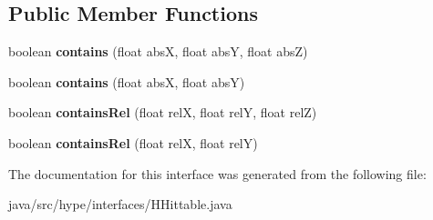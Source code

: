 \subsection*{Public Member Functions}
\begin{DoxyCompactItemize}
\item 
\hypertarget{interfacehype_1_1interfaces_1_1_h_hittable_a50445e254a7c17d114b50c1b6eb27ccc}{boolean {\bfseries contains} (float abs\-X, float abs\-Y, float abs\-Z)}\label{interfacehype_1_1interfaces_1_1_h_hittable_a50445e254a7c17d114b50c1b6eb27ccc}

\item 
\hypertarget{interfacehype_1_1interfaces_1_1_h_hittable_a59b90b964bb7e62e5e6b60c8aca009f1}{boolean {\bfseries contains} (float abs\-X, float abs\-Y)}\label{interfacehype_1_1interfaces_1_1_h_hittable_a59b90b964bb7e62e5e6b60c8aca009f1}

\item 
\hypertarget{interfacehype_1_1interfaces_1_1_h_hittable_a148d257e1043b25a2742af90011d856b}{boolean {\bfseries contains\-Rel} (float rel\-X, float rel\-Y, float rel\-Z)}\label{interfacehype_1_1interfaces_1_1_h_hittable_a148d257e1043b25a2742af90011d856b}

\item 
\hypertarget{interfacehype_1_1interfaces_1_1_h_hittable_a32d82db9b85427d49ef928c091fea464}{boolean {\bfseries contains\-Rel} (float rel\-X, float rel\-Y)}\label{interfacehype_1_1interfaces_1_1_h_hittable_a32d82db9b85427d49ef928c091fea464}

\end{DoxyCompactItemize}


The documentation for this interface was generated from the following file\-:\begin{DoxyCompactItemize}
\item 
java/src/hype/interfaces/H\-Hittable.\-java\end{DoxyCompactItemize}
